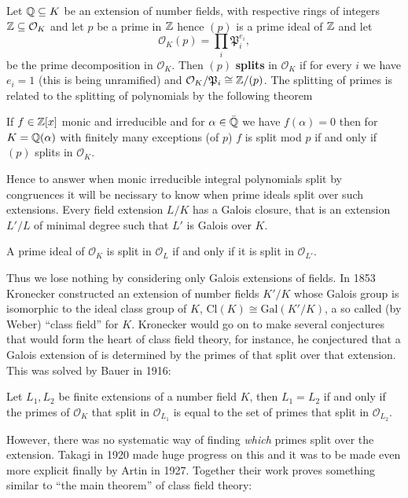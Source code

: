 Let \(\Q \subseteq K\) be an extension of number fields, with respective rings of integers \(\Z \subseteq \mathcal{O}_K\) and let \(p\) be a prime in \(\Z\) hence \((p)\) is a prime ideal of \(\Z\) and let 
\[\mathcal{O}_K(p) = \prod_i \mathfrak{P}_i^{e_i},\]
be the prime decomposition in \(\mathcal{O}_K\). Then \((p)\) \textbf{splits} in \(\mathcal{O}_K\) if for every \(i\) we  have \(e_i = 1\) (this is being unramified) and \(\mathcal{O}_K/\mathfrak{P}_i \cong \Z/(p)\). The splitting of primes is related to the splitting of polynomials by the following theorem
\begin{Theorem}
	If \(f\in \Z[x]\) monic and irreducible and for \(\alpha \in \bar{\Q}\) we have \(f(\alpha) = 0\) then for \(K = \Q(\alpha)\) with finitely many exceptions (of \(p\)) \(f\) is split mod \(p\) if and only if \((p)\) splits in \(\mathcal{O}_K\).
\end{Theorem}
Hence to answer when monic irreducible integral polynomials split by congruences it will be necissary to know when prime ideals split over such extensions. Every field extension \(L/K\) has a Galois closure, that is an extension \(L'/L\) of minimal degree such that \(L'\) is Galois over \(K\). 
\begin{Lemma}
	A prime ideal of \(\mathcal{O}_K\) is split in \(\mathcal{O}_L\) if and only if it is split in \(\mathcal{O}_{L'}\).
\end{Lemma}
Thus we lose nothing by considering only Galois extensions of fields. 
In 1853 Kronecker constructed an extension of number fields \(K'/K\) whose Galois group is isomorphic to the ideal class group of \(K\), \(\mathrm{Cl}(K) \cong \mathrm{Gal}(K'/K)\), a so called (by Weber) ``class field'' for \(K\).
Kronecker would go on to make several conjectures that would form the heart of class field theory, for instance, he conjectured that a Galois extension of \Q is determined by the primes of \Z that split over that extension. This was solved by Bauer in 1916:
\begin{Theorem}
	Let \(L_1, L_2\) be finite extensions of a number field \(K\), then \(L_1 = L_2\) if and only if the primes of \(\mathcal{O}_K\) that split in \(\mathcal{O}_{L_1}\) is equal to the set of primes that split in \(\mathcal{O}_{L_2}\).
\end{Theorem}
However, there was no systematic way of finding \textit{which} primes split over the extension.
 Takagi in 1920 made huge progress on this and it was to be made even more explicit finally by Artin in 1927. Together their work proves something similar to ``the main theorem'' of class field theory:
